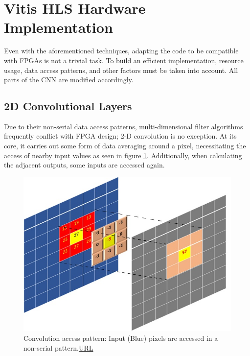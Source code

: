 \section{Vitis HLS Hardware Implementation}
Even with the aforementioned techniques, adapting the code to be compatible with FPGAs is not a trivial task. To build an efficient implementation, resource usage, data access patterns, and other factors must be taken into account. All parts of the CNN are modified accordingly.

\subsection{2D Convolutional Layers}
Due to their non-serial data access patterns, multi-dimensional filter algorithms frequently conflict with FPGA design; 2-D convolution is no exception. At its core, it carries out some form of data averaging around a pixel, necessitating the access of nearby input values as seen in figure \ref{fig: convolution access pattern}. Additionally, when calculating the adjacent outputs, some inputs are accessed again.

\begin{figure}[H]
    \centering
        \includegraphics[width=1\textwidth]{Images/diagrams/convolution_access_pattern.jpg}
        \decoRule
        \caption[convolution access pattern]{Convolution access pattern: Input (Blue) pixels are accessed in a non-serial pattern.\href{https://github.com/Xilinx/Vitis-Tutorials/blob/2022.1/Hardware_Acceleration/Design_Tutorials/01-convolution-tutorial/lab1_app_introduction_performance_estimation.md}{URL} }
        \label{fig: convolution access pattern}
\end{figure}


